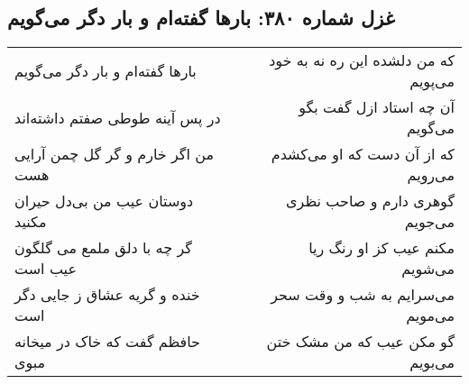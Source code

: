 \begin{center}
\section*{غزل شماره ۳۸۰: بارها گفته‌ام و بار دگر می‌گویم}
\label{sec:sh380}
\begin{longtable}{l p{0.5cm} r}
بارها گفته‌ام و بار دگر می‌گویم
&&
که من دلشده این ره نه به خود می‌پویم
\\
در پس آینه طوطی صفتم داشته‌اند
&&
آن چه استاد ازل گفت بگو می‌گویم
\\
من اگر خارم و گر گل چمن آرایی هست
&&
که از آن دست که او می‌کشدم می‌رویم
\\
دوستان عیب من بی‌دل حیران مکنید
&&
گوهری دارم و صاحب نظری می‌جویم
\\
گر چه با دلق ملمع می گلگون عیب است
&&
مکنم عیب کز او رنگ ریا می‌شویم
\\
خنده و گریه عشاق ز جایی دگر است
&&
می‌سرایم به شب و وقت سحر می‌مویم
\\
حافظم گفت که خاک در میخانه مبوی
&&
گو مکن عیب که من مشک ختن می‌بویم
\\
\end{longtable}
\end{center}
